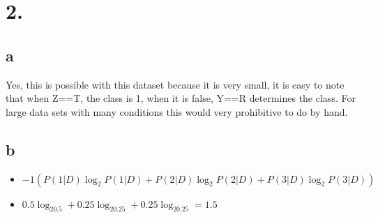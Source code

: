 \documentclass[11pt]{article}
\begin{document}
\section*{2.}
\label{sec:org36f76d0}
\subsection*{a}
\label{sec:org7edfb3b}
Yes, this is possible with this dataset because it is very small, it is easy to
note that when Z==T, the class is 1, when it is false, Y==R determines the
class. For large data sets with many conditions this would very prohibitive to
do by hand.
\subsection*{b}
\label{sec:orgdd4a153}
\begin{itemize}
\item \(-1(P(1|D)\log_2P(1|D) + P(2|D)\log_2P(2|D) + P(3|D)\log_2P(3|D))\)
\item \(0.5\log_20.5 + 0.25\log_20.25 + 0.25\log_20.25 = 1.5\)
\end{itemize}
\end{document}
